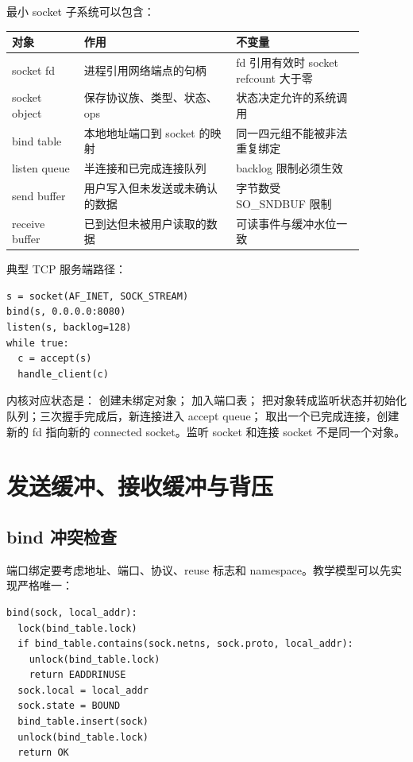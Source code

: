 最小 socket 子系统可以包含：

\begin{longtable}{|p{0.18\linewidth}|p{0.38\linewidth}|p{0.32\linewidth}|}
\toprule
对象 & 作用 & 不变量 \\
\midrule
socket fd & 进程引用网络端点的句柄 & fd 引用有效时 socket refcount 大于零 \\\tablerowrule
socket object & 保存协议族、类型、状态、ops & 状态决定允许的系统调用 \\\tablerowrule
bind table & 本地地址端口到 socket 的映射 & 同一四元组不能被非法重复绑定 \\\tablerowrule
listen queue & 半连接和已完成连接队列 & backlog 限制必须生效 \\\tablerowrule
send buffer & 用户写入但未发送或未确认的数据 & 字节数受 SO\_SNDBUF 限制 \\\tablerowrule
receive buffer & 已到达但未被用户读取的数据 & 可读事件与缓冲水位一致 \\
\bottomrule
\end{longtable}

典型 TCP 服务端路径：

\begin{lstlisting}
s = socket(AF_INET, SOCK_STREAM)
bind(s, 0.0.0.0:8080)
listen(s, backlog=128)
while true:
  c = accept(s)
  handle_client(c)
\end{lstlisting}

内核对应状态是： 创建未绑定对象； 加入端口表； 把对象转成监听状态并初始化队列；三次握手完成后，新连接进入 accept queue； 取出一个已完成连接，创建新的 fd 指向新的 connected socket。监听 socket 和连接 socket 不是同一个对象。

\section{发送缓冲、接收缓冲与背压}

\subsection{bind 冲突检查}

端口绑定要考虑地址、端口、协议、reuse 标志和 namespace。教学模型可以先实现严格唯一：

\begin{lstlisting}
bind(sock, local_addr):
  lock(bind_table.lock)
  if bind_table.contains(sock.netns, sock.proto, local_addr):
    unlock(bind_table.lock)
    return EADDRINUSE
  sock.local = local_addr
  sock.state = BOUND
  bind_table.insert(sock)
  unlock(bind_table.lock)
  return OK
\end{lstlisting}


